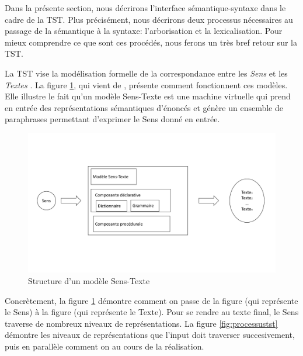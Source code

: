 Dans la présente section, nous décrirons l'interface sémantique-syntaxe dans le cadre de la \ac{TST}. Plus précisément, nous décrirons deux processus nécessaires au passage de la sémantique à la syntaxe: l'arborisation et la lexicalisation. Pour mieux comprendre ce que sont ces procédés, nous ferons un très bref retour sur la \ac{TST}. 

La \ac{TST} vise la modélisation formelle de la correspondance entre les \emph{Sens} et les \emph{Textes} \citep{PolgueretheorieSensTexte1998}. La figure \ref{fig:modeletst}, qui vient de \cite{PolgueretheorieSensTexte1998}, présente comment fonctionnent ces modèles. Elle illustre le fait qu'un modèle Sens-Texte est une machine virtuelle qui prend en entrée des représentations sémantiques d'énoncés et génère un ensemble de paraphrases permettant d'exprimer le Sens donné en entrée. 

\begin{figure}[htb]
	\centering
	\includegraphics[width=1\textwidth, trim = {0cm 4cm 0cm 4cm},clip]{ch3/figs/polguere1.pdf}
	\caption{Structure d'un modèle Sens-Texte \citep{PolgueretheorieSensTexte1998}}
	\label{fig:modeletst}
\end{figure}

Concrètement, la figure \ref{fig:modeletst} démontre comment on passe de la figure  (qui représente le Sens) à la figure  (qui représente le Texte). Pour se rendre au texte final, le Sens traverse de nombreux niveaux de représentations. La figure \ref{fig:processustst} démontre les niveaux de représentations que l'input doit traverser succesivement, puis en parallèle comment on  au cours de la réalisation.

